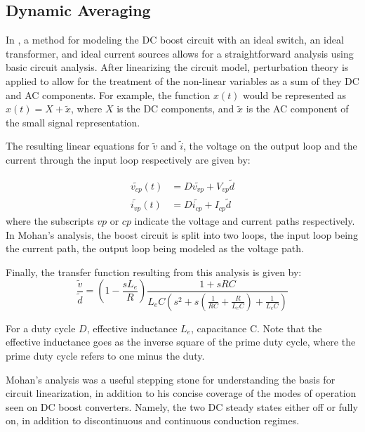 \subsection{Dynamic Averaging}

In \cite{mohan}, a method for modeling the DC boost circuit with an ideal switch, an ideal transformer, and ideal current sources allows for a straightforward analysis using basic circuit analysis. After linearizing the circuit model, perturbation theory is applied to allow for the treatment of the non-linear variables as a sum of they DC and AC components. For example, the function $x(t)$ would be represented as $x(t) = X + \tilde{x}$, where $X$ is the DC components, and $\tilde{x}$ is the AC component of the small signal representation. 

The resulting linear equations for $\tilde{v}$ and $\tilde{i}$, the voltage on the output loop and the current through the input loop respectively are given by: 

\begin{equation}
\begin{split}
\tilde{v_{cp}}(t) &= D\tilde{v_{vp}} + V_{vp}\tilde{d} \\
\tilde{i_{vp}}(t) &= D\tilde{i_{cp}} + I_{cp}\tilde{d}
\end{split}
\end{equation}
where the subscripts $vp$ or $cp$ indicate the voltage and current paths respectively. In Mohan's analysis, the boost circuit is split into two loops, the input loop being the current path, the output loop being modeled as the voltage path. 

Finally, the transfer function resulting from this analysis is given by:
\begin{equation}
\label{thirdOrder}
\frac{\tilde{v}}{\tilde{d}} = (1-\frac{sL_e}{R}) \frac{1 + sRC}{L_eC(s^2+s(\frac{1}{RC} + \frac{R}{L_eC}) + \frac{1}{L_eC})}
\end{equation} 

For a duty cycle $D$, effective inductance $L_e$, capacitance C. Note that the effective inductance goes as the inverse square of the prime duty cycle, where the prime duty cycle refers to one minus the duty. 

Mohan's analysis was a useful stepping stone for understanding the basis for circuit linearization, in addition to his concise coverage of the modes of operation seen on DC boost converters. Namely, the two DC steady states either off or fully on, in addition to discontinuous and continuous conduction regimes. 


